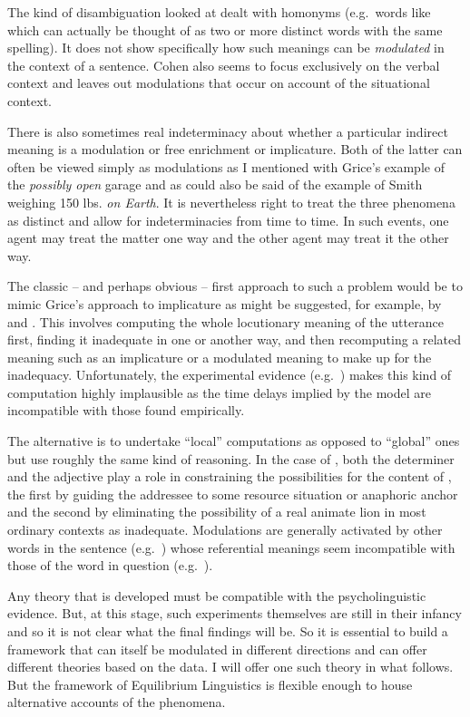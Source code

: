 The kind of disambiguation  looked at dealt with homonyms (e.g.\ words like  which can actually be thought of as two or more distinct words with the same spelling). It does not show specifically how such meanings can be \emph{modulated} in the context of a sentence. Cohen also seems to focus exclusively on the verbal context and leaves out modulations that occur on account of the situational context.

There is also sometimes real indeterminacy about whether a particular indirect meaning is a modulation or free enrichment or implicature. Both of the latter can often be viewed simply as modulations as I mentioned with Grice's example of the \emph{possibly open} garage and as could also be said of the example of Smith weighing 150 lbs. \emph{on Earth}. It is nevertheless right to treat the three phenomena as distinct and allow for indeterminacies from time to time. In such events, one agent may treat the matter one way and the other agent may treat it the other way.

The classic -- and perhaps obvious -- first approach to such a problem would be to mimic Grice's approach to implicature as might be suggested, for example, by \citet{grice:lc} and \citet{searle:m}. This involves computing the whole locutionary meaning of the utterance first, finding it inadequate in one or another way, and then recomputing a related meaning such as an implicature or a modulated meaning to make up for the inadequacy. Unfortunately, the experimental evidence (e.g.\ \citealt{frisson:sulp}) makes this kind of computation highly implausible as the time delays implied by the model are incompatible with those found empirically.

The alternative is to undertake ``local'' computations as opposed to ``global'' ones but use roughly the same kind of reasoning. In the case of , both the determiner  and the adjective  play a role in constraining the possibilities for the content of , the first by guiding the addressee to some resource situation or anaphoric anchor and the second by eliminating the possibility of a real animate lion in most ordinary contexts as inadequate. Modulations are generally activated by other words in the sentence (e.g.\ ) whose referential meanings seem incompatible with those of the word in question (e.g.\ ).

Any theory that is developed must be compatible with the psycholinguistic evidence. But, at this stage, such experiments themselves are still in their infancy and so it is not clear what the final findings will be. So it is essential to build a framework that can itself be modulated in different directions and can offer different theories based on the data. I will offer one such theory in what follows. But the framework of Equilibrium Linguistics is flexible enough to house alternative accounts of the phenomena.

